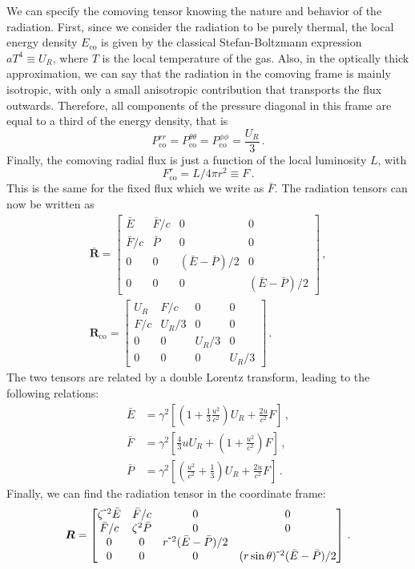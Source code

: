 \documentclass[../main.tex]{subfiles}
\begin{document}
We can specify the comoving tensor knowing the nature and behavior of the radiation.  First, since we consider the radiation to be purely thermal, the local energy density $E_\text{co}$ is given by the classical Stefan-Boltzmann expression $aT^4\equiv U_R$, where $T$ is the local temperature of the gas.  Also, in the optically thick approximation, we can say that the radiation in the comoving frame is mainly isotropic, with only a small anisotropic contribution that transports the flux outwards.  Therefore, all components of the pressure diagonal in this frame are equal to a third of the energy density, that is
\begin{equation}
    P^{rr}_\text{co}=P^{\theta\theta}_\text{co}=P^{\phi\phi}_\text{co}=\frac{U_R}{3} \,.
\end{equation}
Finally, the comoving radial flux is just a function of the local luminosity $L$, with
\begin{equation}
    F^r_\text{co}=L/4\pi r^2\equiv F\,.
\end{equation}
This is the same for the fixed flux which we write as $\bar{F}$. The radiation tensors can now be written as
\begin{gather}
\bm{\bar{R}}=\begin{bmatrix}\bar{E} & \bar{F}/c &0&0\\\bar{F}/c &\bar{P} &0&0\\0&0&(\bar{E}-\bar{P})/2&0\\0&0&0&(\bar{E}-\bar{P})/2\end{bmatrix}\,,
\nonumber\\
\bm{R}_\text{co}=\begin{bmatrix}U_R & F/c&0&0\\F/c&U_R/3&0&0\\0&0&U_R/3&0\\0&0&0&U_R/3\end{bmatrix} \,.
\end{gather}  
The two tensors are related by a double Lorentz transform, leading to the following relations:
\begin{align}
    \bar{E}&=\gamma^2\left[\left(1+\frac{1}{3}\frac{u^2}{c^2}\right)U_R + \frac{2u}{c^2}F\right]\label{eq:E_frametransform}\,,\\
    \bar{F}&=\gamma^2\left[\frac{4}{3}uU_R + \left(1+\frac{u^2}{c^2}\right)F\right]\label{eq:F_frametransform}\,,\\
    \bar{P}&=\gamma^2\left[\left(\frac{u^2}{c^2}+\frac{1}{3}\right)U_R + \frac{2u}{c^2}F\right]\label{eq:P_frametransform} \,.
\end{align}
Finally, we can find the radiation tensor in the coordinate frame:
\begin{equation}\label{eq:coordinate_radstresstensor}
   \bm{R}=\begin{bmatrix}\zeta^{\-2}\bar{E}&\bar{F}/c&0&0\\\bar{F}/c&\zeta^2\bar{P}&0&0\\0&0&r^{\-2}(\bar{E}-\bar{P})/2\\0&0&0&(r\sin\theta)^{\-2}(\bar{E}-\bar{P})/2\end{bmatrix} \,.
\end{equation}
\end{document}
